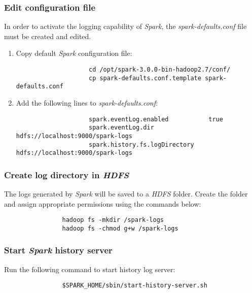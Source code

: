 \documentclass{article}
\begin{document}
            \subsubsection{Edit configuration file}
            In order to activate the logging capability of \emph{Spark}, the \emph{spark-defaults.conf}
            file must be created and edited.
            \begin{enumerate}
                \item Copy default \emph{Spark} configuration file:
                \begin{verbatim}
                    cd /opt/spark-3.0.0-bin-hadoop2.7/conf/
                    cp spark-defaults.conf.template spark-defaults.conf
                \end{verbatim}

                \item Add the following lines to \emph{spark-defaults.conf}:
                \begin{verbatim}
                    spark.eventLog.enabled           true
                    spark.eventLog.dir               hdfs://localhost:9000/spark-logs
                    spark.history.fs.logDirectory    hdfs://localhost:9000/spark-logs
                \end{verbatim}
            \end{enumerate}

            \subsubsection{Create log directory in \emph{HDFS}}
            The logs generated by \emph{Spark} will be saved to a \emph{HDFS} folder. Create the folder
            and assign appropriate permissions using the commands below:
            \begin{verbatim}
                hadoop fs -mkdir /spark-logs
                hadoop fs -chmod g+w /spark-logs
            \end{verbatim}

            \subsubsection{Start \emph{Spark} history server}
            \label{subsec:sparklog}
            Run the following command to start history log server:
            \begin{verbatim}
                $SPARK_HOME/sbin/start-history-server.sh
            \end{verbatim}
\end{document}
